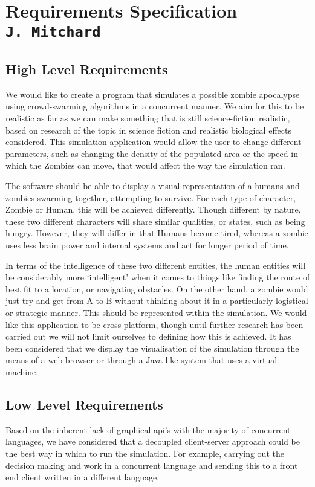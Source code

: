 \pagestyle{empty}

\section{Requirements Specification\\{\small\tt{J.~Mitchard}}}

\subsection{High Level Requirements}
We would like to create a program that simulates a possible zombie apocalypse using crowd-swarming algorithms in a concurrent manner. We aim for this to be realistic as far as we can make something that is still science-fiction realistic, based on research of the topic in science fiction and realistic biological effects considered. This simulation application would allow the user to change different parameters, such as changing the density of the populated area or the speed in which the Zombies can move, that would affect the way the simulation ran. 

The software should be able to display a visual representation of a humans and zombies swarming together, attempting to survive. For each type of character, Zombie or Human, this will be achieved differently. Though different by nature, these two different characters will share similar qualities, or states, such as being hungry. However, they will differ in that Humans become tired, whereas a zombie uses less brain power and internal systems and act for longer period of time.

In terms of the intelligence of these two different entities, the human entities will be considerably more ‘intelligent’ when it comes to things like finding the route of best fit to a location, or navigating obstacles. On the other hand, a zombie would just try and get from A to B without thinking about it in a particularly logistical or strategic manner. This should be represented within the simulation.
We would like this application to be cross platform, though until further research has been carried out we will not limit ourselves to defining how this is achieved. It has been considered that we display the visualisation of the simulation through the means of a web browser or through a Java like system that uses a virtual machine.
\subsection{Low Level Requirements}
Based on the inherent lack of graphical api’s with the majority of concurrent languages, we have considered that a decoupled client-server approach could be the best way in which to run the simulation. For example, carrying out the decision making and work in a concurrent language and sending this to a front end client written in a different language.

